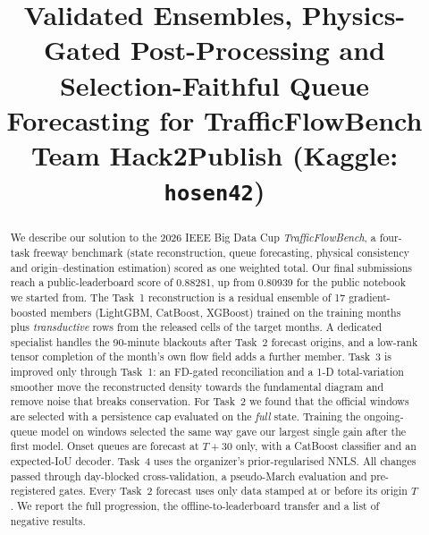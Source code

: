 \documentclass[conference,10pt]{IEEEtran}
\begin{document}
\title{Validated Ensembles, Physics-Gated Post-Processing and Selection-Faithful Queue Forecasting for TrafficFlowBench\\
{\large Team Hack2Publish (Kaggle: \texttt{hosen42})}}

\author{
}

\maketitle

\begin{abstract}
We describe our solution to the 2026 IEEE Big Data Cup \emph{TrafficFlowBench}, a four-task freeway benchmark
(state reconstruction, queue forecasting, physical consistency and origin--destination estimation) scored as one
weighted total. Our final submissions reach a public-leaderboard score of 0.88281, up from 0.80939 for the
public notebook we started from. The Task~1 reconstruction is a residual ensemble of 17 gradient-boosted members
(LightGBM, CatBoost, XGBoost) trained on the training months plus \emph{transductive} rows from the released
cells of the target months. A dedicated specialist handles the 90-minute blackouts after Task~2 forecast origins, and a
low-rank tensor completion of the month's own flow field adds a further member. Task~3 is improved only through Task~1:
an FD-gated reconciliation and a 1-D total-variation smoother move the reconstructed density towards the
fundamental diagram and remove noise that breaks conservation. For Task~2 we found that the official windows are
selected with a persistence cap evaluated on the \emph{full} state. Training the ongoing-queue model on windows
selected the same way gave our largest single gain after the first model. Onset queues are forecast at $T{+}30$ only,
with a CatBoost classifier and an expected-IoU decoder. Task~4 uses the organizer's prior-regularised NNLS. All
changes passed through day-blocked cross-validation, a pseudo-March evaluation and pre-registered gates. Every
Task~2 forecast uses only data stamped at or before its origin $T$. We report the full progression, the
offline-to-leaderboard transfer and a list of negative results.
\end{abstract}
\end{document}

